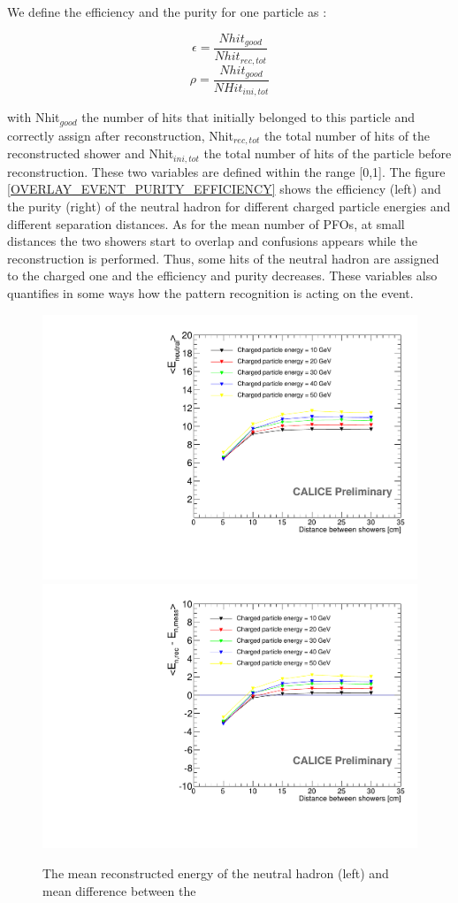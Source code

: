 \documentclass[cits]{JINST}
\begin{document}
We define the efficiency and the purity for one particle as :

\begin{equation}
  \epsilon =  \frac{Nhit_{good}}{Nhit_{rec,tot}}
\end{equation}
\begin{equation}
  \rho = \frac{Nhit_{good}}{NHit_{ini,tot}}
\end{equation}

with Nhit$_{good}$ the number of hits that initially belonged to this particle and correctly assign after reconstruction, Nhit$_{rec,tot}$ the total number of hits of the reconstructed shower and Nhit$_{ini,tot}$ the total number of hits of the particle before reconstruction. These two variables are defined within the range [0,1]. The figure \ref{OVERLAY_EVENT_PURITY_EFFICIENCY} shows the efficiency (left) and the purity (right) of the neutral hadron for different charged particle energies and different separation distances. As for the mean number of PFOs, at small distances the two showers start to overlap and confusions appears while the reconstruction is performed. Thus, some hits of the neutral hadron are assigned to the charged one and the efficiency and purity decreases. These variables also quantifies in some ways how the pattern recognition is acting on the event.

\begin{figure}[!h]
  \begin{center}
    \includegraphics[width=0.47\linewidth]{plots/OverlayEvent_NeutralEnergyMean.pdf}
    \includegraphics[width=0.47\linewidth]{plots/OverlayEvent_NeutralEnergyDifferenceMean.pdf}
  \end{center}
  \caption{\label{OVERLAY_EVENT_EREC} The mean reconstructed energy of the neutral hadron (left) and mean difference between the }
\end{figure}
\end{document}
